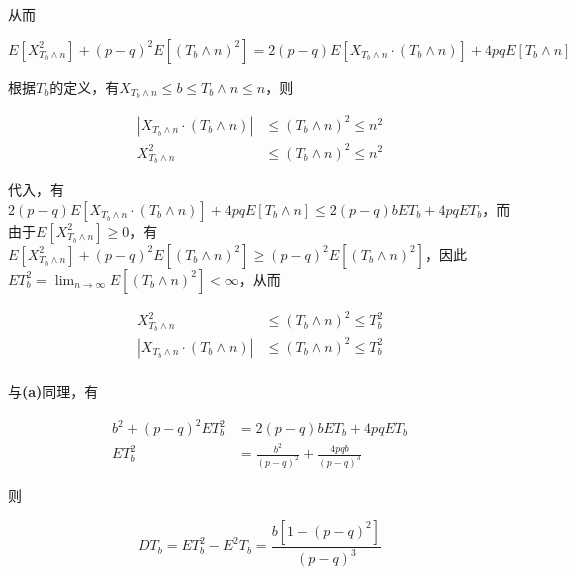 \documentclass{../notes}
\begin{document}
\begin{subquestions}
        从而

        \begin{equation}
            E[X^2_{T_b\land n}] + (p-q)^2E[(T_b\land n)^2] = 2(p-q)E[X_{T_b\land n}\cdot (T_b\land n)] + 4pqE[T_b\land n]
            \label{eq:4.3.2}
        \end{equation}

        根据$T_b$的定义，有$X_{T_b\land n}\leq b\leq T_b\land n\leq n$，则

        \begin{equation}
            \begin{aligned}
                \left|X_{T_b\land n}\cdot (T_b\land n)\right| &\leq \left(T_b\land n\right)^2 \leq n^2 \\
                X^2_{T_b\land n} &\leq \left(T_b\land n\right)^2 \leq n^2
            \end{aligned}
        \end{equation}

        代入，有$2(p-q)E[X_{T_b\land n}\cdot (T_b\land n)] + 4pqE[T_b\land n]\leq 2(p-q)bET_b + 4pqET_b$，而由于$E[X^2_{T_b\land n}]\geq 0$，有$E[X^2_{T_b\land n}] + (p-q)^2E[(T_b\land n)^2]\geq (p-q)^2E[(T_b\land n)^2]$，因此$ET_b^2 = \lim_{n\rightarrow \infty}E\left[(T_b\land n)^2\right] < \infty$，从而

        \begin{equation}
            \begin{aligned}
                X_{T_b\land n}^2&\leq (T_b\land n)^2\leq T_b^2 \\
                \left|X_{T_b\land n}\cdot (T_b\land n)\right|&\leq (T_b\land n)^2\leq T_b^2 \\
            \end{aligned}
        \end{equation}

        与\textbf{(a)}同理，有

        \begin{equation}
            \begin{aligned}
                b^2 + (p-q)^2 ET_b^2 &= 2(p-q)bET_b + 4pqET_b \\
                ET_b^2 &= \frac{b^2}{(p-q)^2} + \frac{4pqb}{(p-q)^3}
            \end{aligned}
        \end{equation}

        则

        \begin{equation}
            DT_b = ET_b^2 - E^2T_b = \frac{b[1 - (p-q)^2]}{(p-q)^3}
        \end{equation}
    \end{subquestions}
\end{document}
